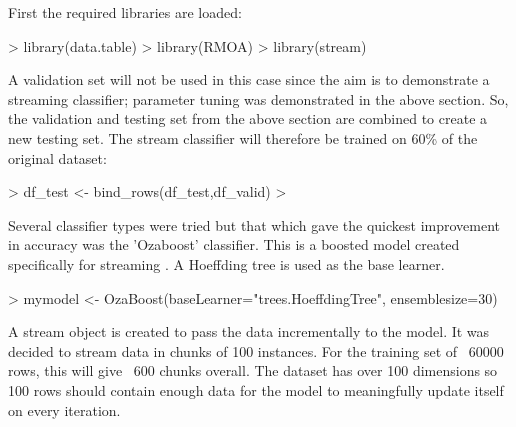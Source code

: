 \documentclass[10pt]{article}
\begin{document}
First the required libraries are loaded:
\hspace{1cm} 
\begin{Schunk}
\begin{Sinput}
> library(data.table)
> library(RMOA)
> library(stream)
\end{Sinput}
\end{Schunk}
\hspace{1cm} 

A validation set will not be used in this case since the aim is to demonstrate a streaming classifier; parameter tuning was demonstrated in the above section. So, the validation and testing set from the above section are combined to create a new testing set. The stream classifier will therefore be trained on 60\% of the original dataset:
\hspace{1cm} 
\begin{Schunk}
\begin{Sinput}
> df_test <- bind_rows(df_test,df_valid)
> 
\end{Sinput}
\end{Schunk}
\hspace{1cm} 
Several classifier types were tried but that which gave the quickest improvement in accuracy was the 'Ozaboost' classifier. This is a boosted model created specifically for streaming \cite{6934280}. A Hoeffding tree is used as the base learner.
\hspace{1cm} 
\begin{Schunk}
\begin{Sinput}
> mymodel <- OzaBoost(baseLearner="trees.HoeffdingTree", ensemblesize=30)
\end{Sinput}
\end{Schunk}
\hspace{1cm} 
A stream object is created to pass the data incrementally to the model. It was decided to stream data in chunks of 100 instances. For the training set of ~60000 rows, this will give ~600 chunks overall. The dataset has over 100 dimensions so 100 rows should contain enough data for the model to meaningfully update itself on every iteration.
\hspace{1cm} 
\begin{Schunk}
\end{Schunk}
\end{document}
